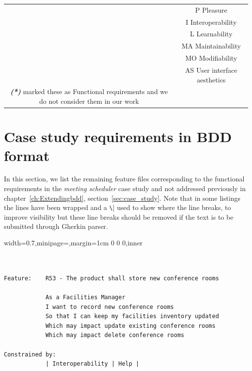 \documentclass[dissertation,final]{softeng}
\newenvironment{featurecode}[1]
{ \lrbox\featurebox \begin{adjustbox}{width=#1\textwidth,minipage=\textwidth,margin=1cm 0 0 0,inner} }
{ \end{adjustbox}\endlrbox}
\newenvironment{featurelist}[2]
{
\newcommand{\setcaption}{\caption{#1}}
\newcommand{\setlabel}{\label{#2}}
}
{\begin{listing}[h!]\centering\usebox\featurebox\setcaption\setlabel\end{listing}}
\begin{document}
\begin{appendices}
\begin{table}[h!]
{{\begin{tabular}{c c c}
                & \multicolumn{2}{c}{P  Pleasure} \\
                & \multicolumn{2}{c}{I  Interoperability} \\
                & \multicolumn{2}{c}{L  Learnability} \\
                & \multicolumn{2}{c}{MA Maintainability} \\
                & \multicolumn{2}{c}{MO Modifiability} \\
                & \multicolumn{2}{c}{AS User interface aesthetics} \\
                \multicolumn{2}{c}{\multirow{3}[1]{*}{\emph{\bfseries{(*)}} \citet{MylopoulosOnt2014} marked these as Functional requirements and we do not consider them in our work}} 
            \end{tabular}
        }
  }
\end{table}


\clearpage
\section{Case study requirements in BDD format}

In this section, we list the remaining feature files corresponding to the functional requirements in the \emph{meeting scheduler} case study and not addressed previously in chapter~\ref{ch:Extendingbdd}, section~\ref{sec:case_study}.
Note that in some listings the lines have been wrapped and a \verb|\|| used to show where the line breaks, to improve visibility but these line breaks should be removed if the text is to be submitted through Gherkin parser.

\begin{featurelist}{R53 -- The product shall store new conference rooms}{lst:feature_r53}
\begin{featurecode}{0.7}
\begin{verbatim}


Feature:    R53 - The product shall store new conference rooms
	
            As a Facilities Manager
            I want to record new conference rooms
            So that I can keep my facilities inventory updated
            Which may impact update existing conference rooms
            Which may impact delete conference rooms
			
Constrained by:
            | Interoperability | Help |


\end{verbatim}
\end{featurecode}
\end{featurelist}
\end{appendices}
\end{document}
